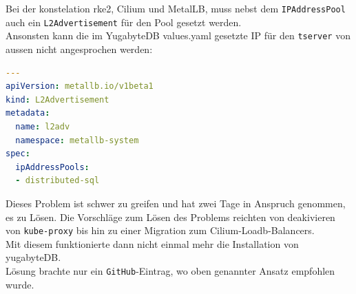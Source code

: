\begin{flushleft}
    Bei der konstelation \gls{rke2}, \Gls{Cilium} und \Gls{MetalLB}, muss nebst dem \texttt{IPAddressPool} auch ein \texttt{L2Advertisement} für den Pool gesetzt werden.\\
    Ansonsten kann die im YugabyteDB values.yaml gesetzte IP für den \texttt{tserver} von aussen nicht angesprochen werden:
    \lstset{style=gra_codestyle}
    \begin{lstlisting}[language=yaml, caption=metallb - Konfig YAML - Detail L2Advertisement,captionpos=b,label={lst:metallb-l2advertisement-setting},breaklines=true]
---
apiVersion: metallb.io/v1beta1
kind: L2Advertisement
metadata:
  name: l2adv
  namespace: metallb-system
spec:
  ipAddressPools:
  - distributed-sql
    \end{lstlisting}
    Dieses Problem ist schwer zu greifen und hat zwei Tage in Anspruch genommen, es zu Lösen.
    Die Vorschläge zum Lösen des Problems reichten von deakivieren von \texttt{kube-proxy} bis hin zu einer Migration zum \Gls{Cilium}-Loadb-Balancers.\\
    Mit diesem funktionierte dann nicht einmal mehr die Installation von yugabyteDB.\\
    Lösung brachte nur ein \texttt{GitHub}-Eintrag\cite{D4IZIEFN}, wo oben genannter Ansatz empfohlen wurde.
\end{flushleft}
